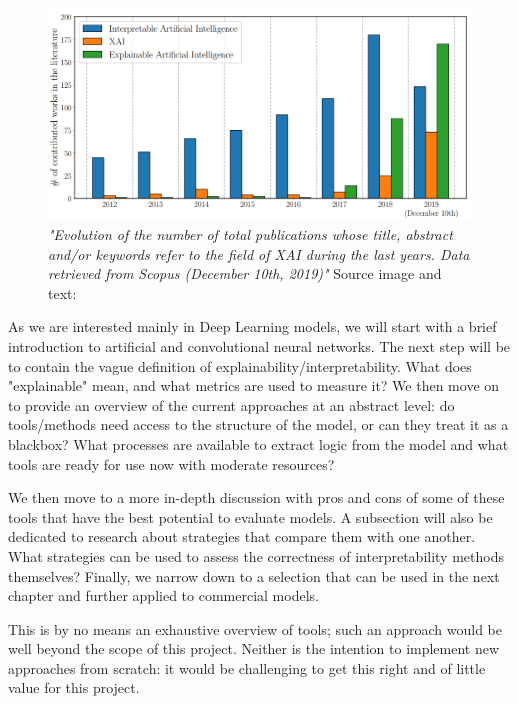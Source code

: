 \documentclass[proposal]{softeng}
\begin{document}
\begin{figure}[h!]
\centering
\includegraphics[scale=0.5]{images/evolution_publications.png}
\caption{\textit{"Evolution of the number of total publications whose title, abstract and/or keywords refer to the field of XAI during the last years. Data retrieved from Scopus (December 10th, 2019)"} Source image and text:\cite{BarredoArrietaAlejandro2020EAIX}}
\label{fig:evolution_publications}
\end{figure}


As we are interested mainly in Deep Learning models, we will start with a brief introduction to artificial and convolutional neural networks. The next step will be to contain the vague definition of explainability/interpretability. What does "explainable" mean, and what metrics are used to measure it? We then move on to provide an overview of the current approaches at an abstract level: do tools/methods need access to the structure of the model, or can they treat it as a blackbox? What processes are available to extract logic from the model and what tools are ready for use now with moderate resources?

We then move to a more in-depth discussion with pros and cons of some of these tools that have the best potential to evaluate models. A subsection will also be dedicated to research about strategies that compare them with one another. What strategies can be used to assess the correctness of interpretability methods themselves? Finally, we narrow down to a selection that can be used in the next chapter and further applied to commercial models.

This is by no means an exhaustive overview of tools; such an approach would be well beyond the scope of this project. Neither is the intention to implement new approaches from scratch: it would be challenging to get this right and of little value for this project.
\end{document}
